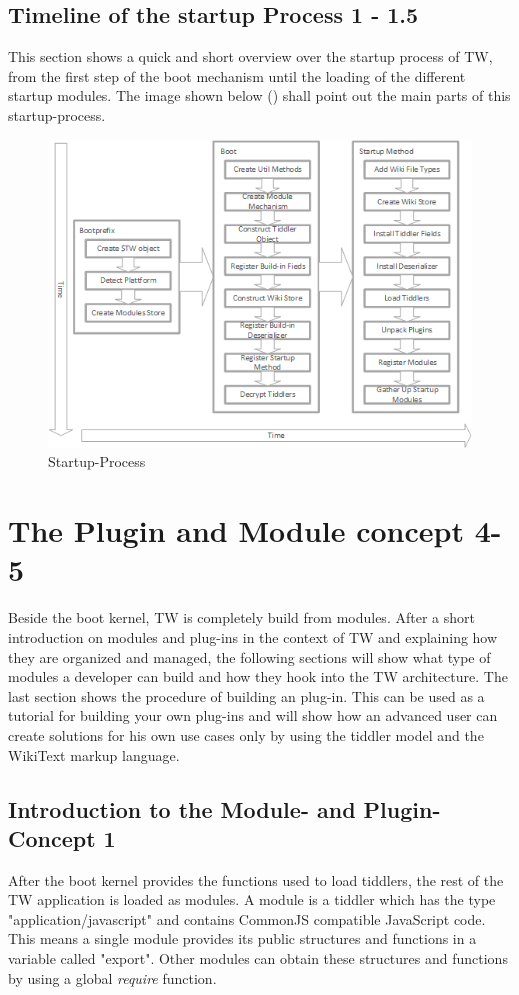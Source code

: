 \documentclass[12pt,a4paper]{scrartcl}
\newcommand{\todo}[1]{{\bf TODO: #1}\\
}
\begin{document}
\subsection{Timeline of the startup Process 1 - 1.5}
This section shows a quick and short overview over the startup process of TW, from the first step of the boot mechanism until the loading of the different startup modules. The image shown below () shall point out the main parts of this startup-process.
\begin{figure}[hbtp]
\caption{Startup-Process}
\label{fig:start}
\includegraphics[scale=1]{images/StartupTimeline.png}
\end{figure}
\section{The Plugin and Module concept 4-5}
Beside the boot kernel, TW is completely build from modules.
After a short introduction on modules and plug-ins in the context of TW and explaining how they are organized and managed,
the following sections will show what type of modules a developer can build and how they hook into the TW architecture.
The last section shows the procedure of building an plug-in.
This can be used as a tutorial for building your own plug-ins and will show how an advanced user can create solutions for his own use cases only by using the tiddler model and the WikiText markup language.

\subsection{Introduction to the Module- and Plugin-Concept 1}
After the boot kernel provides the functions used to load tiddlers, the rest of the TW application is loaded as modules.
A module is a tiddler which has the type "application/javascript" and contains CommonJS compatible JavaScript code. This means a single module provides its public structures and functions in a variable called "export". Other modules can obtain these structures and functions by using a global \textit{require} function.
\end{document}
